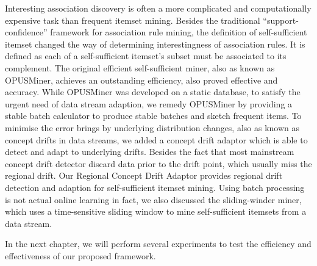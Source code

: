 Interesting association discovery is often a more complicated and computationally expensive task than frequent itemset mining. Besides the traditional ``support-confidence'' framework for association rule mining, the definition of self-sufficient itemset changed the way of determining interestingness of association rules. It is defined as each of a self-sufficient itemset's subset must be associated to its complement. The original efficient self-sufficient miner, also as known as OPUSMiner, achieves an outstanding efficiency, also proved effective and accuracy. While OPUSMiner was developed on a static database, to satisfy the urgent need of data stream adaption, we remedy OPUSMiner by providing a stable batch calculator to produce stable batches and sketch frequent items. To minimise the error brings by underlying distribution changes, also as known as concept drifts in data streams, we added a concept drift adaptor which is able to detect and adapt to underlying drifts. Besides the fact that most mainstream concept drift detector discard data prior to the drift point, which usually miss the regional drift. Our Regional Concept Drift Adaptor provides regional drift detection and adaption for self-sufficient itemset mining. Using batch processing is not actual online learning in fact, we also discussed the sliding-winder miner, which uses a time-sensitive sliding window to mine self-sufficient itemsets from a data stream.

In the next chapter, we will perform several experiments to test the efficiency and effectiveness of our proposed framework.
